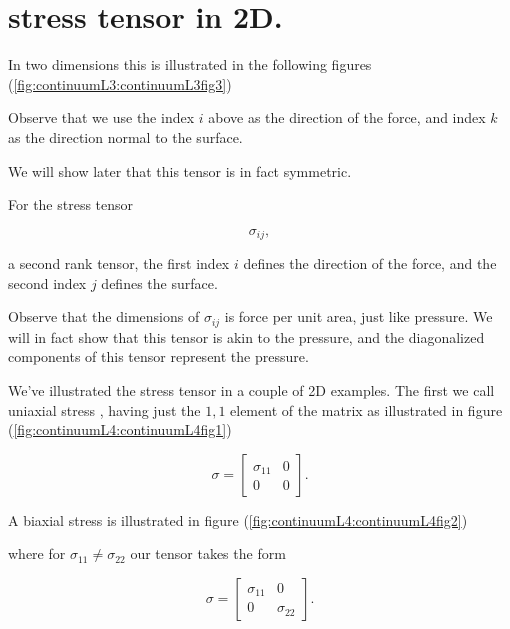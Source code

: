 \label{chap:continuumL4}
\section{stress tensor in 2D.}

In two dimensions this is illustrated in the following figures (\ref{fig:continuumL3:continuumL3fig3})

Observe that we use the index $i$ above as the direction of the force, and index $k$ as the direction normal to the surface.

We will show later that this tensor is in fact symmetric.

For the stress tensor

\begin{equation}\label{eqn:continuumL4:10}
\sigma_{ij},
\end{equation}

a second rank tensor, the first index $i$ defines the direction of the force, and the second index $j$ defines the surface.

Observe that the dimensions of $\sigma_{ij}$ is force per unit area, just like pressure.  We will in fact show that this tensor is akin to the pressure, and the diagonalized components of this tensor represent the pressure.

We've illustrated the stress tensor in a couple of 2D examples.  The first we call uniaxial stress , having just the $1,1$ element of the matrix as illustrated in figure (\ref{fig:continuumL4:continuumL4fig1})


\begin{equation}\label{eqn:continuumL4:30}
\sigma = 
\begin{bmatrix}
\sigma_{11} & 0 \\
0 & 0
\end{bmatrix}.
\end{equation}

A biaxial stress  is illustrated in figure (\ref{fig:continuumL4:continuumL4fig2})

where for $\sigma_{11} \ne \sigma_{22}$ our tensor takes the form

\begin{equation}\label{eqn:continuumL4:50}
\sigma = 
\begin{bmatrix}
\sigma_{11} & 0 \\
0 & \sigma_{22}
\end{bmatrix}.
\end{equation}

